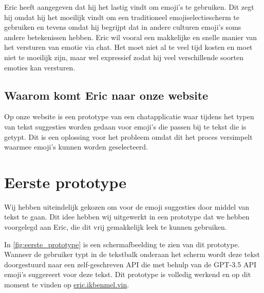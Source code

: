 \documentclass[12pt]{article}
\begin{document}
Eric heeft aangegeven dat hij het lastig vindt om emoji's te gebruiken.
Dit zegt hij omdat hij het moeilijk vindt om een traditioneel emojiselectiescherm te gebruiken en tevens omdat hij begrijpt dat in andere culturen emoji's soms andere betekenissen hebben.
Eric wil vooral een makkelijke en snelle manier van het versturen van emotie via chat.
Het moet niet al te veel tijd kosten en moet niet te moeilijk zijn, maar wel expressief zodat hij veel verschillende soorten emoties kan versturen.

\subsection{Waarom komt Eric naar onze website}

Op onze website is een prototype van een chatapplicatie waar tijdens het typen van tekst suggesties worden gedaan voor emoji's die passen bij te tekst die is getypt.
Dit is een oplossing voor het probleem omdat dit het proces versimpelt waarmee emoji's kunnen worden geselecteerd.

\clearpage\section{Eerste prototype}

Wij hebben uiteindelijk gekozen om voor de emoji suggesties door middel van tekst te gaan.
Dit idee hebben wij uitgewerkt in een prototype dat we hebben voorgelegd aan Eric, die dit vrij gemakkelijk leek te kunnen gebruiken.

\def\figureautorefname{figuur}
In \autoref{fig:eerste_prototype} is een schermafbeelding te zien van dit prototype.
Wanneer de gebruiker typt in de tekstbalk onderaan het scherm wordt deze tekst doorgestuurd naar een zelf-geschreven API die met behulp van de GPT-3.5 API emoji's suggereert voor deze tekst.
Dit prototype is volledig werkend en op dit moment te vinden op \href{https://eric.ikbenmel.vin}{eric.ikbenmel.vin}.
\end{document}
